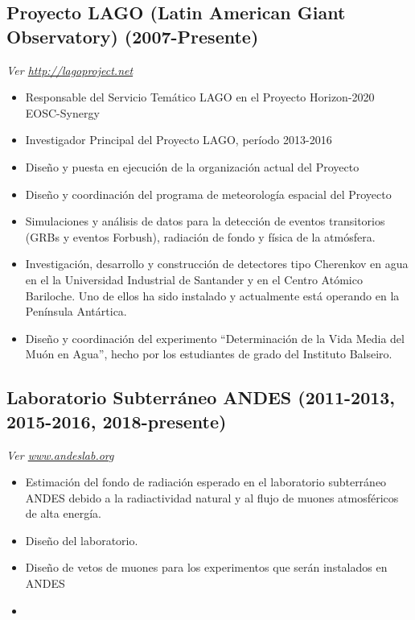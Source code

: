 \subsection*{Proyecto LAGO (Latin American Giant Observatory) (2007-Presente)}
{\small{\textit{Ver \href{http://lagoproject.net}{http://lagoproject.net}}}}
\begin{itemize}

\item Responsable del Servicio Temático LAGO en el Proyecto Horizon-2020 EOSC-Synergy
\item Investigador Principal del Proyecto LAGO, período 2013-2016
\item Diseño y puesta en ejecución de la organización actual del Proyecto
\item Diseño y coordinación del programa de meteorología espacial del Proyecto
\item Simulaciones y análisis de datos para la detección de eventos transitorios (GRBs y eventos Forbush), radiación de fondo y física de la atmósfera.
\item Investigación, desarrollo y construcción de detectores tipo Cherenkov en agua en el la Universidad Industrial de Santander y en el Centro Atómico Bariloche. Uno de ellos ha sido instalado y actualmente está operando en la Península Antártica.
\item Diseño y coordinación del experimento ``Determinación de la Vida Media del Muón en Agua'', hecho por los estudiantes de grado del Instituto Balseiro.
\end{itemize}
\subsection*{Laboratorio Subterráneo ANDES (2011-2013, 2015-2016, 2018-presente)}
{\small{\textit{Ver \href{http://www.andeslab.org}{www.andeslab.org}}}}
\begin{itemize}
\item Estimación del fondo de radiación esperado en el laboratorio subterráneo ANDES debido a la radiactividad natural y al flujo de muones atmosféricos de alta energía.
\item Diseño del laboratorio.
\item Diseño de vetos de muones para los experimentos que serán instalados en ANDES
\item \end{itemize}

\ifres
\else
